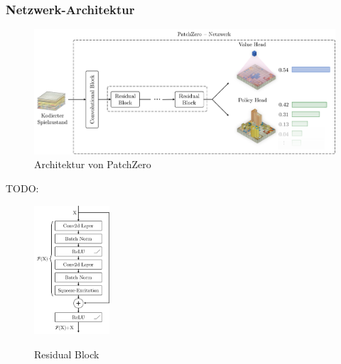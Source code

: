 \subsubsection*{Netzwerk-Architektur}

\begin{figure}[!ht]
    \centering
    \vspace*{-1.75cm}
    \includegraphics[width=\textwidth]{res/pictures/patch-zero-architecture.pdf}
    \caption{Architektur von PatchZero}
    \label{fig:patch-zero-architecture}
\end{figure}

TODO:

\begin{figure}
    \includegraphics[width=0.25\textwidth]{res/pictures/resblock.pdf}
    \centering
    \caption[Residual Block]{\unskip}
    Residual Block
    \label{fig:resblock}
\end{figure}

